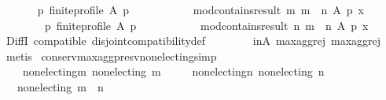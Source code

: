 \begin{isabellebody}
\ \ \isanewline
\ \ \ \ {\isachardoublequoteopen}{\isacharparenleft}{\kern0pt}{\isasymforall}p{\isachardot}{\kern0pt}\ finite{\isacharunderscore}{\kern0pt}profile\ A\ p\ {\isasymlongrightarrow}\isanewline
\ \ \ \ \ \ \ \ \ \ mod{\isacharunderscore}{\kern0pt}contains{\isacharunderscore}{\kern0pt}result\ m\ {\isacharparenleft}{\kern0pt}m\ {\isasymparallel}\isactrlsub {\isasymup}\ n{\isacharparenright}{\kern0pt}\ A\ p\ x{\isacharparenright}{\kern0pt}\ {\isasymor}\isanewline
\ \ \ \ \ \ \ \ {\isacharparenleft}{\kern0pt}{\isasymforall}p{\isachardot}{\kern0pt}\ finite{\isacharunderscore}{\kern0pt}profile\ A\ p\ {\isasymlongrightarrow}\isanewline
\ \ \ \ \ \ \ \ \ \ mod{\isacharunderscore}{\kern0pt}contains{\isacharunderscore}{\kern0pt}result\ n\ {\isacharparenleft}{\kern0pt}m\ {\isasymparallel}\isactrlsub {\isasymup}\ n{\isacharparenright}{\kern0pt}\ A\ p\ x{\isacharparenright}{\kern0pt}{\isachardoublequoteclose}\isanewline
%
\isadelimproof
\ \ %
\endisadelimproof
%
\isatagproof
{}\isamarkupfalse%
\ DiffI\ compatible\ disjoint{\isacharunderscore}{\kern0pt}compatibility{\isacharunderscore}{\kern0pt}def\isanewline
\ \ \ \ \ \ \ \ in{\isacharunderscore}{\kern0pt}A\ max{\isacharunderscore}{\kern0pt}agg{\isacharunderscore}{\kern0pt}rej{}\ max{\isacharunderscore}{\kern0pt}agg{\isacharunderscore}{\kern0pt}rej{}\isanewline
\ \ \isamarkupfalse%
\ metis%
\endisatagproof
{\isafoldproof}%
%
\isadelimproof
%
\endisadelimproof
%
\isadelimdocument
%
\endisadelimdocument
%
\isatagdocument
%
\isamarkuptrue%
%
\endisatagdocument
{\isafolddocument}%
%
\isadelimdocument
%
\endisadelimdocument
{}\isamarkupfalse%
\ conserv{\isacharunderscore}{\kern0pt}max{\isacharunderscore}{\kern0pt}agg{\isacharunderscore}{\kern0pt}presv{\isacharunderscore}{\kern0pt}non{\isacharunderscore}{\kern0pt}electing{\isacharbrackleft}{\kern0pt}simp{\isacharbrackright}{\kern0pt}{\isacharcolon}{\kern0pt}\isanewline
\ \ \isanewline
\ \ \ \ non{\isacharunderscore}{\kern0pt}electing{\isacharunderscore}{\kern0pt}m{\isacharcolon}{\kern0pt}\ {\isachardoublequoteopen}non{\isacharunderscore}{\kern0pt}electing\ m{\isachardoublequoteclose}\ \isanewline
\ \ \ \ non{\isacharunderscore}{\kern0pt}electing{\isacharunderscore}{\kern0pt}n{\isacharcolon}{\kern0pt}\ {\isachardoublequoteopen}non{\isacharunderscore}{\kern0pt}electing\ n{\isachardoublequoteclose}\isanewline
\ \ \ {\isachardoublequoteopen}non{\isacharunderscore}{\kern0pt}electing\ {\isacharparenleft}{\kern0pt}m\ {\isasymparallel}\isactrlsub {\isasymup}\ n{\isacharparenright}{\kern0pt}{\isachardoublequoteclose}\isanewline

\end{isabellebody}
